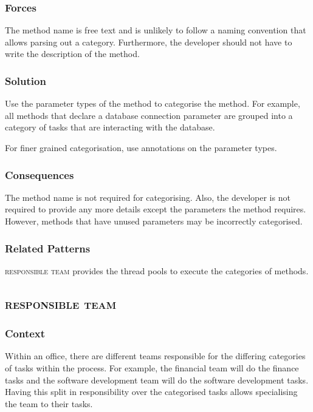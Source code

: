\documentclass[prodmode]{style/acmlarge}
\begin{document}
\subsubsection*{Forces} The method name is free text and is unlikely to follow a
naming convention that allows parsing out a category.  Furthermore, the
developer should not have to write the description of the method.

\subsubsection*{Solution} Use the parameter types of the method to categorise
the method.  For example, all methods that declare a database connection
parameter are grouped into a category of tasks that are interacting with the
database.

For finer grained categorisation, use annotations on the parameter types.

\subsubsection*{Consequences} The method name is not required for categorising.
Also, the developer is not required to provide any more details except the
parameters the method requires.  However, methods that have unused parameters
may be incorrectly categorised.

\subsubsection*{Related Patterns} \textsc{responsible team} provides the thread
pools to execute the categories of methods.



\subsection{\textsc{\textbf{responsible team}}}

\subsubsection*{Context} Within an office, there are different teams responsible
for the differing categories of tasks within the process.  For example, the
financial team will do the finance tasks and the software development team will
do the software development tasks.  Having this split in responsibility over the
categorised tasks allows specialising the team to their tasks.
\end{document}
